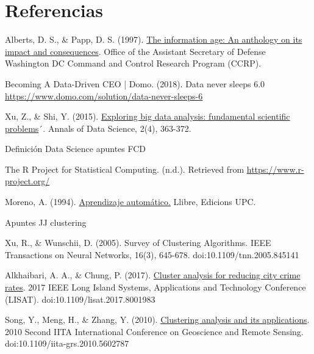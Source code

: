 \documentclass[10pt, a4paper]{article}
\begin{document}
\section{Referencias}
\renewcommand{\section}[2]{}
\begin{thebibliography}{X}

 Alberts, D. S., \& Papp, D. S. (1997). \href{http://www.dodccrp.org/files/Alberts_Anthology_I.pdf} {The information age: An anthology on its impact and consequences}. Office of the Assistant Secretary of Defense Washington DC Command and Control Research Program (CCRP).

 Becoming A Data-Driven CEO | Domo. (2018). Data never sleeps 6.0 \href{https://www.domo.com/solution/data-never-sleeps-6} {https://www.domo.com/solution/data-never-sleeps-6}

 Xu, Z., \& Shi, Y. (2015). \href {https://link.springer.com/content/pdf/10.1007/s40745-015-0063-7.pdf} {Exploring big data analysis: fundamental scientific problems}´. Annals of Data Science, 2(4), 363-372.

 Definición Data Science apuntes FCD

 The R Project for Statistical Computing. (n.d.). Retrieved from \href{https://www.r-project.org/} {https://www.r-project.org/}

 Moreno, A. (1994). \href{https://upcommons.upc.edu/bitstream/handle/2099.3/36157/9788483019962.pdf?sequence=1&isAllowed=y} {Aprendizaje automático.} Llibre, Edicions UPC.

 Apuntes JJ clustering

 Xu, R., \& Wunschii, D. (2005). Survey of Clustering Algorithms. IEEE Transactions on Neural Networks, 16(3), 645-678. doi:10.1109/tnn.2005.845141

 Alkhaibari, A. A., \& Chung, P. (2017). \href{https://ieeexplore.ieee.org/document/8001983} {Cluster analysis for reducing city crime rates}. 2017 IEEE Long Island Systems, Applications and Technology Conference (LISAT). doi:10.1109/lisat.2017.8001983

 Song, Y., Meng, H., \& Zhang, Y. (2010). \href{https://ieeexplore.ieee.org/document/5602787} {Clustering analysis and its applications}. 2010 Second IITA International Conference on Geoscience and Remote Sensing. doi:10.1109/iita-grs.2010.5602787


\end{thebibliography}
\end{document}
